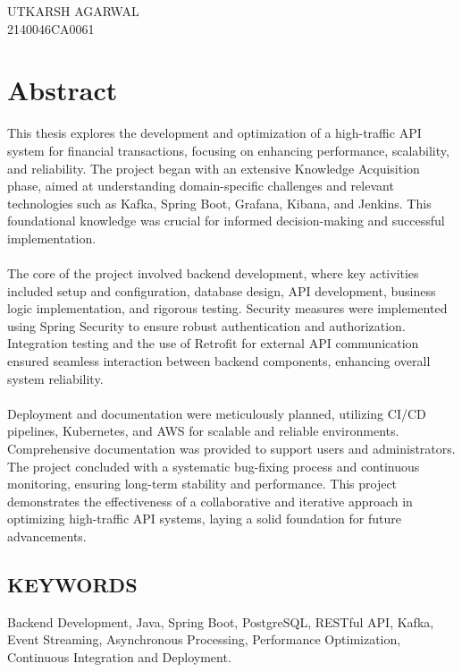 \documentclass[12pt,a4paper]{report}
\begin{document}
\vspace{1cm}

\begin{flushright}
UTKARSH AGARWAL \\
2140046CA0061
\end{flushright}


\chapter*{Abstract}
This thesis explores the development and optimization of a high-traffic API system for financial transactions, focusing on enhancing performance, scalability, and reliability. The project began with an extensive Knowledge Acquisition phase, aimed at understanding domain-specific challenges and relevant technologies such as Kafka, Spring Boot, Grafana, Kibana, and Jenkins. This foundational knowledge was crucial for informed decision-making and successful implementation.
\\\\
\noindent The core of the project involved backend development, where key activities included setup and configuration, database design, API development, business logic implementation, and rigorous testing. Security measures were implemented using Spring Security to ensure robust authentication and authorization. Integration testing and the use of Retrofit for external API communication ensured seamless interaction between backend components, enhancing overall system reliability.
\\\\
\noindent Deployment and documentation were meticulously planned, utilizing CI/CD pipelines, Kubernetes, and AWS for scalable and reliable environments. Comprehensive documentation was provided to support users and administrators. The project concluded with a systematic bug-fixing process and continuous monitoring, ensuring long-term stability and performance. This project demonstrates the effectiveness of a collaborative and iterative approach in optimizing high-traffic API systems, laying a solid foundation for future advancements.

\section*{KEYWORDS} Backend Development, Java, Spring Boot, PostgreSQL, RESTful API, Kafka, Event Streaming, Asynchronous Processing, Performance Optimization, Continuous Integration and Deployment.
\end{document}
